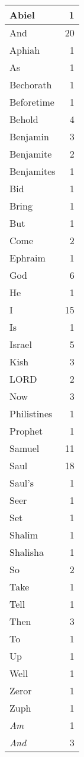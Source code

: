 \begin{center}
\begin{longtable}{l|r}
\hline \hline
\endlastfoot
Abiel & 1 \\ \hline
And & 20 \\ \hline
Aphiah & 1 \\ \hline
As & 1 \\ \hline
Bechorath & 1 \\ \hline
Beforetime & 1 \\ \hline
Behold & 4 \\ \hline
Benjamin & 3 \\ \hline
Benjamite & 2 \\ \hline
Benjamites & 1 \\ \hline
Bid & 1 \\ \hline
Bring & 1 \\ \hline
But & 1 \\ \hline
Come & 2 \\ \hline
Ephraim & 1 \\ \hline
God & 6 \\ \hline
He & 1 \\ \hline
I & 15 \\ \hline
Is & 1 \\ \hline
Israel & 5 \\ \hline
Kish & 3 \\ \hline
LORD & 2 \\ \hline
Now & 3 \\ \hline
Philistines & 1 \\ \hline
Prophet & 1 \\ \hline
Samuel & 11 \\ \hline
Saul & 18 \\ \hline
Saul's & 1 \\ \hline
Seer & 1 \\ \hline
Set & 1 \\ \hline
Shalim & 1 \\ \hline
Shalisha & 1 \\ \hline
So & 2 \\ \hline
Take & 1 \\ \hline
Tell & 1 \\ \hline
Then & 3 \\ \hline
To & 1 \\ \hline
Up & 1 \\ \hline
Well & 1 \\ \hline
Zeror & 1 \\ \hline
Zuph & 1 \\ \hline
\emph{Am} & 1 \\ \hline
\emph{And} & 3 \\ \hline

\end{longtable}
\end{center}

